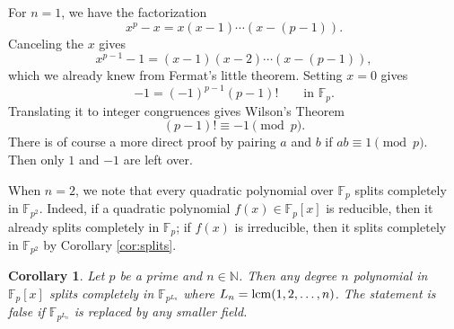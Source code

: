 \documentclass{article}
\def\lcm{{\rm lcm}}
\def\F{{\mathbb F}}
\def\N{{\mathbb N}}
\def\F{{\mathbb F}}
\newtheorem{cor}[subsection]{Corollary}
\begin{document}
For $n = 1$, we have the factorization
$$x^p - x = x(x - 1)\cdots(x - (p-1)).$$
Canceling the $x$ gives $$x^{p-1} - 1 = (x - 1)(x - 2)\cdots(x - (p-1)),$$
which we already knew from Fermat's little theorem. Setting $x = 0$ gives $$-1 = (-1)^{p-1}(p-1)!\qquad\mbox{in }\F_p.$$
Translating it to integer congruences gives Wilson's Theorem
$$(p-1)!\equiv -1\pmod{p}.$$
There is of course a more direct proof by pairing $a$ and $b$ if $ab\equiv 1\pmod{p}$. Then only $1$ and $-1$ are left over.

\begin{comment}
    The case $n = 2$ is particularly interesting. There are $(p^2 - p)/2$ monic irreducible quadratic polynomials. We assume $p>2$. Then we may complete the square of any monic quadratic polynomial as
$$x^2 + ax + b = \Big(x + \frac{a}{2}\Big)^2 - \Big(\frac{a^2}{4} - b\Big).$$
Here the fractions can be viewed as multiplications by $2^{-1}$ and $4^{-1}$ in $\F_p$. Now a quadratic of the form $x^2 - c$ is irreducible if and only if $c$ is not a square in $\F_p$. We say a congruence class $c$ mod $p$ is a \textbf{quadratic residue} mod $p$ if $c$ is a square in $\F_p$; otherwise, we say it is a \textbf{quadratic non-residue}. We see that each quadratic non-residue $c$ gives rise to $p$ irreducible polynomials of the form $(x + a)^2 - c$. Hence, there are $\frac{p-1}{2}$ quadratic non-residues, and $\frac{p+1}{2}$ quadratic residues. If we remove $0$ mod $p$, then there is an equal number of them. Moreover, we know that every quadratic polynomial has a root in $\F_{p^2}$. 
\end{comment}

When $n = 2$, we note that every quadratic polynomial over $\F_p$ splits completely in $\F_{p^2}$. Indeed, if a quadratic polynomial $f(x)\in\F_p[x]$ is reducible, then it already splits completely in $\F_p$; if $f(x)$ is irreducible, then it splits completely in $\F_{p^2}$ by Corollary \ref{cor:splits}.

\begin{cor}
    Let $p$ be a prime and $n\in\N$. Then any degree $n$ polynomial in $\F_p[x]$ splits completely in $\F_{p^{L_n}}$ where $L_n = \lcm(1,2,\ldots,n)$. The statement is false if $\F_{p^{L_n}}$ is replaced by any smaller field.
\end{cor}
\end{document}
